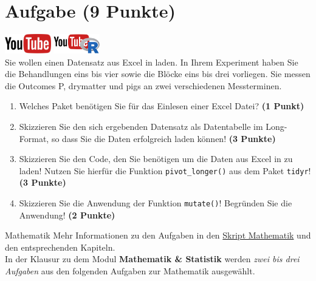 \documentclass[a4paper, 10pt]{scrartcl}\usepackage[]{graphicx}\usepackage[]{xcolor}
\begin{document}
 
\clearpage

\section{Aufgabe \hfill (9 Punkte)}

\hfill\href{https://youtu.be/Oxa97uqNyCQ}{\includegraphics[width =
  2cm]{img/youtube}}
\hspace{2Ex}
\href{https://youtu.be/ymFfBkWyb8s}{\includegraphics[width =
  2cm]{img/youtube_R}}\\[1Ex]




Sie wollen einen Datensatz aus Excel in \Rlogo laden. In Ihrem Experiment haben Sie
die Behandlungen eins bis vier sowie die Bl{\"o}cke eins bis drei
vorliegen. Sie messen die Outcomes P, drymatter und pigs an zwei verschiedenen Messterminen.

\begin{enumerate}
\item Welches \Rlogo Paket ben{\"o}tigen Sie f{\"u}r das Einlesen einer Excel Datei?
  \textbf{(1 Punkt)} 
\item Skizzieren Sie den sich ergebenden Datensatz als Datentabelle im
  Long-Format, so dass Sie die Daten erfolgreich \Rlogo laden k{\"o}nnen!
  \textbf{(3 Punkte)}
\item Skizzieren Sie den \Rlogo Code, den Sie ben{\"o}tigen um die Daten aus
  Excel in \Rlogo zu laden! Nutzen Sie hierf{\"u}r die Funktion
  \texttt{pivot\_longer()} aus dem \Rlogo Paket \texttt{tidyr}! \textbf{(3
    Punkte)}
\item Skizzieren Sie die Anwendung der Funktion \texttt{mutate()}!
  Begr{\"u}nden Sie die Anwendung! \textbf{(2 Punkte)}
\end{enumerate}


 
\clearpage
\begin{graybox}{Mathematik}
Mehr Informationen zu den Aufgaben in den \href{https://jkruppa.github.io/math/}{Skript Mathematik} und den entsprechenden Kapiteln.\\

In der Klausur zu dem Modul \textbf{Mathematik \& Statistik} werden \textit{zwei bis drei Aufgaben} aus den folgenden Aufgaben zur Mathematik ausgewählt. \\
\end{graybox}
\clearpage
\end{document}
